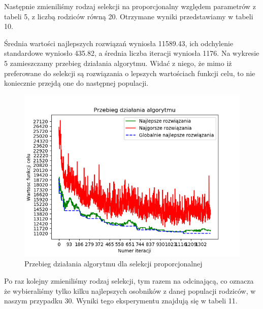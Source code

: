 \documentclass[12pt]{article}
\begin{document}
\par
Następnie zmieniliśmy rodzaj selekcji na proporcjonalny względem parametrów z tabeli 5, z liczbą rodziców równą 20. Otrzymane wyniki przedstawiamy w tabeli 10.
\begin{table}[H]
\caption{Wyniki testów dla selekcji proporcjonalnej}
\begin{center}
\end{center}
\end{table}
Średnia wartości najlepszych rozwiązań wyniosła 11589.43, ich odchylenie standardowe wyniosło 435.82, a średnia liczba iteracji wyniosła 1176. Na wykresie 5 zamieszczamy przebieg działania algorytmu. Widać z niego, że mimo iż preferowane do selekcji są rozwiązania o lepszych wartościach funkcji celu, to nie koniecznie przejdą one do następnej populacji.
\begin{figure}[H]
\caption{Przebieg działania algorytmu dla selekcji proporcjonalnej}
\includegraphics[scale=1]{proportionate=20_v4.png}
\end{figure}
\par
Po raz kolejny zmieniliśmy rodzaj selekcji, tym razem na odcinającą, co oznacza że wybieraliśmy tylko kilku najlepszych osobników z danej populacji rodziców, w naszym przypadku 30. Wyniki tego eksperymentu znajdują się w tabeli 11.
\end{document}
